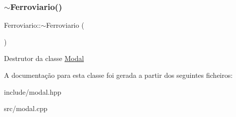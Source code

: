 \subsubsection{\texorpdfstring{$\sim$\+Ferroviario()}{~Ferroviario()}}
{\footnotesize\ttfamily Ferroviario\+::$\sim$\+Ferroviario (\begin{DoxyParamCaption}{ }\end{DoxyParamCaption})}

Destrutor da classe \hyperlink{classModal}{Modal}

A documentação para esta classe foi gerada a partir dos seguintes ficheiros\+:\begin{DoxyCompactItemize}
\item 
include/modal.\+hpp\item 
src/modal.\+cpp\end{DoxyCompactItemize}
